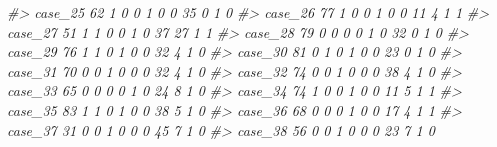 \documentclass[]{book}
\newenvironment{Shaded}{\begin{snugshade}}{\end{snugshade}}
\newcommand{\CommentTok}[1]{\textcolor[rgb]{0.56,0.35,0.01}{\textit{#1}}}
\begin{document}
\begin{Shaded}
\begin{Highlighting}[]
\CommentTok{#> case_25   62        1        0                0                 1                 0              0                    35                      0           1             0}
\CommentTok{#> case_26   77        1        0                0                 1                 0              0                    11                      4           1             1}
\CommentTok{#> case_27   51        1        1                0                 0                 1              0                    37                     27           1             1}
\CommentTok{#> case_28   79        0        0                0                 0                 1              0                    32                      0           1             0}
\CommentTok{#> case_29   76        1        1                0                 1                 0              0                    32                      4           1             0}
\CommentTok{#> case_30   81        0        1                0                 1                 0              0                    23                      0           1             0}
\CommentTok{#> case_31   70        0        0                1                 0                 0              0                    32                      4           1             0}
\CommentTok{#> case_32   74        0        0                1                 0                 0              0                    38                      4           1             0}
\CommentTok{#> case_33   65        0        0                0                 0                 1              0                    24                      8           1             0}
\CommentTok{#> case_34   74        1        0                0                 1                 0              0                    11                      5           1             1}
\CommentTok{#> case_35   83        1        1                0                 1                 0              0                    38                      5           1             0}
\CommentTok{#> case_36   68        0        0                0                 1                 0              0                    17                      4           1             1}
\CommentTok{#> case_37   31        0        0                1                 0                 0              0                    45                      7           1             0}
\CommentTok{#> case_38   56        0        0                1                 0                 0              0                    23                      7           1             0}

\end{Highlighting}
\end{Shaded}
\end{document}
